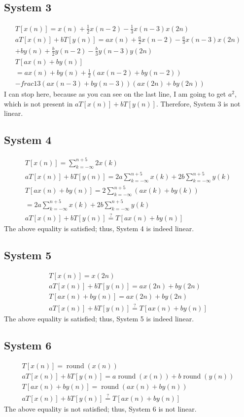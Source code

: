 \documentclass{article}
\begin{document}
\subsection*{System 3}
\begin{gather*}
    T[x(n)] = x(n) + \frac12 x(n-2) - \frac13 x(n-3)x(2n)\\
    aT[x(n)] + bT[y(n)] = ax(n) + \frac{a}2 x(n-2) - \frac{a}3 x(n-3)x(2n)\\+ by(n) + \frac{b}2 y(n-2) - \frac{b}3 y(n-3)y(2n)\\
    T[ax(n) + by(n)] \\= ax(n) + by(n)
    +\frac12(ax(n-2) + by(n-2))
    \\-frac13(ax(n-3) + by(n-3))(ax(2n) + by(2n))
\end{gather*} I can stop here, because as you can see on the
last line, I am going to get \(a^2\), which is not present in
\(aT[x(n)] + bT[y(n)]\). Therefore, System 3 is not linear.

\subsection*{System 4}
\begin{gather*}
    T[x(n)] = \sum_{k = -\infty}^{n+5} 2x(k)\\
    aT[x(n)] + bT[y(n)] = 2a\sum_{k = -\infty}^{n+5} x(k) + 2b\sum_{k = -\infty}^{n+5} y(k)\\
    T[ax(n) + by(n)] = 2\sum_{k = -\infty}^{n+5} (ax(k) + by(k))\\
    = 2a\sum_{k = -\infty}^{n+5} x(k) + 2b\sum_{k = -\infty}^{n+5} y(k)\\
    aT[x(n)] + bT[y(n)] \overset{?}{=} T[ax(n) + by(n)]
\end{gather*}The above equality is satisfied; thus, System 4
is indeed linear.

\subsection*{System 5}
\begin{gather*}
    T[x(n)] = x(2n)\\
    aT[x(n)] + bT[y(n)] = ax(2n) + by(2n)\\
    T[ax(n) + by(n)] = ax(2n) + by(2n)\\
    aT[x(n)] + bT[y(n)] \overset{?}{=} T[ax(n) + by(n)]
\end{gather*}The above equality is satisfied; thus, System 5
is indeed linear.

\subsection*{System 6}
\begin{gather*}
    T[x(n)] = \operatorname{round}(x(n))\\
    aT[x(n)] + bT[y(n)] = a\operatorname{round}(x(n)) + b\operatorname{round}(y(n))\\
    T[ax(n) + by(n)] = \operatorname{round}(ax(n) + by(n))\\
    aT[x(n)] + bT[y(n)] \overset{?}{=} T[ax(n) + by(n)]
\end{gather*} The above equality is not satisfied;
thus, System 6 is not linear.
\end{document}
